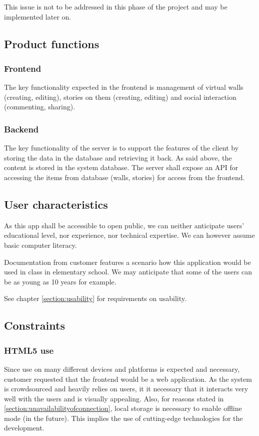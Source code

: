 \documentclass[11pt]{book}
\begin{document}
This issue is not to be addressed in this phase of the project and may be implemented later on.

\subsection{Product functions}

\subsubsection{Frontend}
The key functionality expected in the frontend is management of virtual walls (creating, editing), stories on them (creating, editing) and social interaction (commenting, sharing).

\subsubsection{Backend}
The key functionality of the server is to support the features of the client by storing the data in the database and retrieving it back. As said above, the content is stored in the system database. The server shall expose an API for accessing the items from database (walls, stories) for access from the frontend.

\subsection{User characteristics} \label{section:srs-usercharacteristics}
As this app shall be accessible to open public, we can neither anticipate users’ educational level, nor experience, nor technical expertise. We can however assume basic computer literacy.

Documentation from customer features a scenario how this application would be used in class in elementary school. We may anticipate that some of the users can be as young as 10 years for example.

See chapter \ref{section:usability} for requirements on usability.

\subsection{Constraints}

\subsubsection{HTML5 use}
Since use on many different devices and platforms is expected and necessary, customer requested that the frontend would be a web application. As the system is crowdsourced and heavily relies on users, it it necessary that it interacts very well with the users and is visually appealing. Also, for reasons stated in \ref{section:unavailabilityofconnection}, local storage is necessary to enable offline mode (in the future). This implies the use of cutting-edge technologies for the development.
\end{document}
